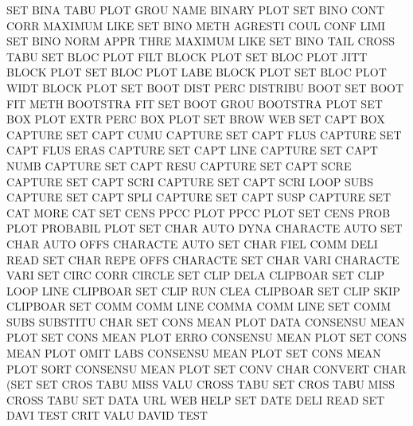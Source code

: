 SET      BINA TABU PLOT GROU NAME       BINARY   PLOT
SET      BINO CONT CORR                 MAXIMUM  LIKE
SET      BINO METH                      AGRESTI  COUL CONF LIMI
SET      BINO NORM APPR THRE            MAXIMUM  LIKE
SET      BINO TAIL                      CROSS    TABU
SET      BLOC PLOT FILT                 BLOCK    PLOT
SET      BLOC PLOT JITT                 BLOCK    PLOT
SET      BLOC PLOT LABE                 BLOCK    PLOT
SET      BLOC PLOT WIDT                 BLOCK    PLOT
SET      BOOT DIST PERC                 DISTRIBU BOOT
SET      BOOT FIT  METH                 BOOTSTRA FIT
SET      BOOT GROU                      BOOTSTRA PLOT
SET      BOX  PLOT EXTR PERC            BOX      PLOT
SET      BROW                           WEB
SET      CAPT BOX                       CAPTURE
SET      CAPT CUMU                      CAPTURE
SET      CAPT FLUS                      CAPTURE
SET      CAPT FLUS ERAS                 CAPTURE
SET      CAPT LINE                      CAPTURE
SET      CAPT NUMB                      CAPTURE
SET      CAPT RESU                      CAPTURE
SET      CAPT SCRE                      CAPTURE
SET      CAPT SCRI                      CAPTURE
SET      CAPT SCRI LOOP SUBS            CAPTURE
SET      CAPT SPLI                      CAPTURE
SET      CAPT SUSP                      CAPTURE
SET      CAT  MORE                      CAT
SET      CENS PPCC PLOT                 PPCC     PLOT
SET      CENS PROB PLOT                 PROBABIL PLOT
SET      CHAR AUTO DYNA                 CHARACTE AUTO
SET      CHAR AUTO OFFS                 CHARACTE AUTO
SET      CHAR FIEL COMM DELI            READ
SET      CHAR REPE OFFS                 CHARACTE
SET      CHAR VARI                      CHARACTE VARI
SET      CIRC CORR                      CIRCLE
SET      CLIP DELA                      CLIPBOAR
SET      CLIP LOOP LINE                 CLIPBOAR
SET      CLIP RUN  CLEA                 CLIPBOAR
SET      CLIP SKIP                      CLIPBOAR
SET      COMM COMM LINE                 COMMA    COMM LINE
SET      COMM SUBS                      SUBSTITU CHAR
SET      CONS MEAN PLOT DATA            CONSENSU MEAN PLOT
SET      CONS MEAN PLOT ERRO            CONSENSU MEAN PLOT
SET      CONS MEAN PLOT OMIT LABS       CONSENSU MEAN PLOT
SET      CONS MEAN PLOT SORT            CONSENSU MEAN PLOT
SET      CONV CHAR                      CONVERT  CHAR (SET
SET      CROS TABU MISS VALU            CROSS    TABU
SET      CROS TABU MISS                 CROSS    TABU
SET      DATA URL                       WEB      HELP
SET      DATE DELI                      READ
SET      DAVI TEST CRIT VALU            DAVID    TEST
